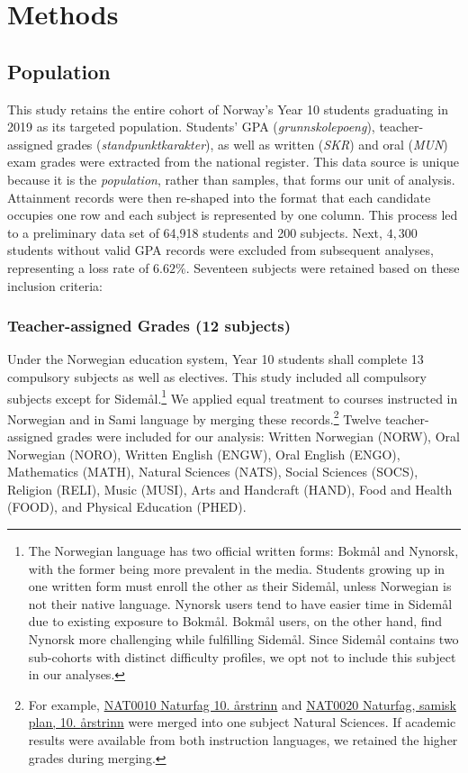 \section{Methods}

\subsection{Population}

This study retains the entire cohort of Norway's Year 10 students graduating in 2019 as its targeted population. Students' GPA (\textit{grunnskolepoeng}), teacher-assigned grades (\textit{standpunktkarakter}), as well as written (\textit{SKR}) and oral (\textit{MUN}) exam grades were extracted from the national register. This data source is unique because it is the \emph{population}, rather than samples, that forms our unit of analysis. Attainment records were then re-shaped into the format that each candidate occupies one row and each subject is represented by one column. This process led to a preliminary data set of 64,918 students and 200 subjects. Next, $4,300$ students without valid GPA records were excluded from subsequent analyses, representing a loss rate of $6.62\%$. Seventeen subjects were retained based on these inclusion criteria:

\subsubsection{Teacher-assigned Grades (12 subjects)}

Under the Norwegian education system, Year 10 students shall complete 13 compulsory subjects as well as electives. This study included all compulsory subjects except for Sidem{\aa}l.\footnote{The Norwegian language has two official written forms: Bokm{\aa}l and Nynorsk, with the former being more prevalent in the media. Students growing up in one written form must enroll the other as their Sidem{\aa}l, unless Norwegian is not their native language. Nynorsk users tend to have easier time in Sidem{\aa}l due to existing exposure to Bokm{\aa}l. Bokm{\aa}l users, on the other hand, find Nynorsk more challenging while fulfilling Sidem{\aa}l. Since Sidem{\aa}l contains two sub-cohorts with distinct difficulty profiles, we opt not to include this subject in our analyses.} We applied equal treatment to courses instructed in Norwegian and in Sami language by merging these records.\footnote{For example, \href{https://www.udir.no/kl06/nat0010}{NAT0010 Naturfag 10. {\aa}rstrinn} and \href{https://www.udir.no/kl06/nat0020}{NAT0020 Naturfag, samisk plan, 10. {\aa}rstrinn} were merged into one subject Natural Sciences. If academic results were available from both instruction languages, we retained the higher grades during merging.} Twelve teacher-assigned grades were included for our analysis: Written Norwegian (NORW), Oral Norwegian (NORO), Written English (ENGW), Oral English (ENGO), Mathematics (MATH), Natural Sciences (NATS), Social Sciences (SOCS), Religion (RELI), Music (MUSI), Arts and Handcraft (HAND), Food and Health (FOOD), and Physical Education (PHED).

